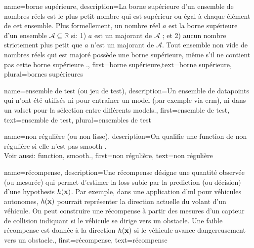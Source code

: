 {name={borne supérieure},
	description={La  borne supérieure d'un ensemble de nombres réels est 
		le plus petit nombre qui est supérieur ou égal à chaque élément de cet ensemble. 
		Plus formellement, un nombre réel $a$ est la borne supérieure d'un ensemble 
		$\mathcal{A} \subseteq \mathbb{R}$ si: 1) $a$ est un majorant de $\mathcal{A}$ ; 
		et 2) aucun nombre strictement plus petit que $a$ n'est un majorant de $\mathcal{A}$. 
		Tout ensemble non vide de nombres réels qui est majoré possède une borne supérieure, même s'il ne 
		contient pas cette borne supérieure \cite[Sec.~1.4]{RudinBookPrinciplesMatheAnalysis}.},
	first={borne supérieure},text={borne supérieure}, plural={bornes supérieures}
}

{name={ensemble de test (ou jeu de test)},
	description={Un ensemble de \glspl{datapoint} qui n'ont été utilisés ni pour entraîner un \gls{model} (par exemple via \gls{erm}), ni dans un \gls{valset} pour la sélection entre différents \glspl{model}.},
	first={ensemble de test},
	text={ensemble de test}, plural={ensembles de test}
}

{name={non régulière (ou non lisse)},
	description={On qualifie une \gls{function} de non régulière si elle n’est pas \gls{smooth} \cite{nesterov04}.
		\\
		Voir aussi: \gls{function}, \gls{smooth}.},
	first={non régulière},
	text={non régulière}
}

{name={récompense},
	description={Une récompense désigne une quantité observée 
		(ou mesurée) qui permet d’estimer la \gls{loss} subie par la \gls{prediction} 
		(ou décision) d’une \gls{hypothesis} $h({\bf x})$. Par exemple, dans une 
		application d'\gls{ml} pour véhicules autonomes, $h({\bf x})$ pourrait représenter 
		la direction actuelle du volant d’un véhicule. On peut construire une récompense à partir 
		des mesures d’un capteur de collision indiquant si le véhicule se dirige vers un obstacle. 
		Une faible récompense est donnée à la direction $h({\bf x})$ si le véhicule 
		avance dangereusement vers un obstacle.},
	first={récompense}, text={récompense}}

